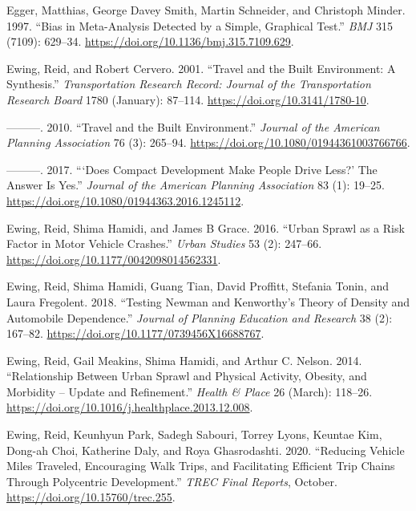\documentclass[
  11pt,
  openany]{memoir}
\newlength{\cslhangindent}
\newlength{\cslentryspacingunit} %
\newenvironment{CSLReferences}[2] %
 {%
  \setlength{\parindent}{0pt}
  \ifodd #1
  \let\oldpar\par
  \def\par{\hangindent=\cslhangindent\oldpar}
  \fi
  \setlength{\parskip}{#2\cslentryspacingunit}
 }%
 {}
\begin{document}
\begin{CSLReferences}{1}{0}
\leavevmode{}%
Egger, Matthias, George Davey Smith, Martin Schneider, and Christoph Minder. 1997. {``Bias in Meta-Analysis Detected by a Simple, Graphical Test.''} \emph{BMJ} 315 (7109): 629--34. \url{https://doi.org/10.1136/bmj.315.7109.629}.

\leavevmode{}%
Ewing, Reid, and Robert Cervero. 2001. {``Travel and the {Built Environment}: A {Synthesis}.''} \emph{Transportation Research Record: Journal of the Transportation Research Board} 1780 (January): 87--114. \url{https://doi.org/10.3141/1780-10}.

\leavevmode{}%
---------. 2010. {``Travel and the {Built Environment}.''} \emph{Journal of the American Planning Association} 76 (3): 265--94. \url{https://doi.org/10.1080/01944361003766766}.

\leavevmode{}%
---------. 2017. {``{`{Does Compact Development Make People Drive Less}?'} {The Answer Is Yes}.''} \emph{Journal of the American Planning Association} 83 (1): 19--25. \url{https://doi.org/10.1080/01944363.2016.1245112}.

\leavevmode{}%
Ewing, Reid, Shima Hamidi, and James B Grace. 2016. {``Urban Sprawl as a Risk Factor in Motor Vehicle Crashes.''} \emph{Urban Studies} 53 (2): 247--66. \url{https://doi.org/10.1177/0042098014562331}.

\leavevmode{}%
Ewing, Reid, Shima Hamidi, Guang Tian, David Proffitt, Stefania Tonin, and Laura Fregolent. 2018. {``Testing {Newman} and {Kenworthy}'s {Theory} of {Density} and {Automobile Dependence}.''} \emph{Journal of Planning Education and Research} 38 (2): 167--82. \url{https://doi.org/10.1177/0739456X16688767}.

\leavevmode{}%
Ewing, Reid, Gail Meakins, Shima Hamidi, and Arthur C. Nelson. 2014. {``Relationship Between Urban Sprawl and Physical Activity, Obesity, and Morbidity -- {Update} and Refinement.''} \emph{Health \& Place} 26 (March): 118--26. \url{https://doi.org/10.1016/j.healthplace.2013.12.008}.

\leavevmode{}%
Ewing, Reid, Keunhyun Park, Sadegh Sabouri, Torrey Lyons, Keuntae Kim, Dong-ah Choi, Katherine Daly, and Roya Ghasrodashti. 2020. {``Reducing {Vehicle Miles Traveled}, {Encouraging Walk Trips}, and {Facilitating Efficient Trip Chains Through Polycentric Development}.''} \emph{TREC Final Reports}, October. \url{https://doi.org/10.15760/trec.255}.


\end{CSLReferences}
\end{document}
